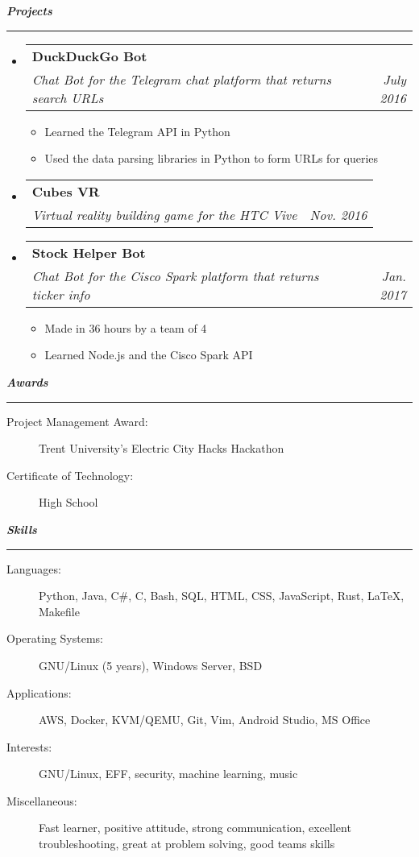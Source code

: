 \documentclass[letterpaper,11pt]{article}
\makeatletter
\newcommand{\resitem}[1]{\item #1 \vspace{-2pt}}
\newcommand{\mysection}[1]{\vspace{5pt} {\bfseries \textsl{#1}} \\ {\color{gray} \rule[5pt]{\textwidth}{1pt}}}
\newcommand{\ressubheading}[4]{\begin{tabular*}{6.5in}{l@{\extracolsep{\fill}}r}
		\textbf{#1} & #2 \\
		\textit{#3} & \textit{#4} \\
\end{tabular*}\vspace{-6pt}}
\makeatother
\begin{document}
\mysection{Projects}
\begin{itemize}
\item
	\ressubheading{DuckDuckGo Bot}{}{Chat Bot for the Telegram chat platform that returns search URLs}{July 2016}
	\begin{itemize}
		\resitem{Learned the Telegram API in Python}
		\resitem{Used the data parsing libraries in Python to form URLs for queries}
	\end{itemize}

\item
\ressubheading{Cubes VR}{}{Virtual reality building game for the HTC Vive}{Nov. 2016}

\item
	\ressubheading{Stock Helper Bot}{}{Chat Bot for the Cisco Spark platform that returns ticker info}{Jan. 2017}
	\begin{itemize}
		\resitem{Made in 36 hours by a team of 4}
		\resitem{Learned Node.js and the Cisco Spark API}
	\end{itemize}
\end{itemize}

\mysection{Awards}
\begin{description}
	\item[Project Management Award:]
	Trent University's Electric City Hacks Hackathon
	\item[Certificate of Technology:] High School
\end{description}

\mysection{Skills}
\begin{description}
\item[Languages:]
Python, Java, C\#, C, Bash, SQL, HTML, CSS, JavaScript, Rust, \LaTeX{}, Makefile
\item[Operating Systems:]
GNU/Linux (5 years), Windows Server, BSD
\item[Applications:]
AWS, Docker, KVM/QEMU, Git, Vim, Android Studio, MS Office
\item[Interests:]
GNU/Linux, EFF, security, machine learning, music
\item[Miscellaneous:]
Fast learner, positive attitude, strong communication, excellent troubleshooting, great at problem solving, good teams skills
\end{description}
\end{document}
